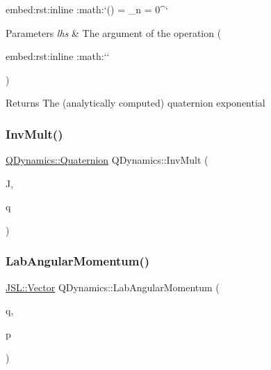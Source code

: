 \begin{DoxyVerb}embed:rst:inline :math:`\exp() = \sum_{n = 0}^\infty {}` \end{DoxyVerb}
 
\begin{DoxyParams}{Parameters}
{\em lhs} & The argument of the operation (\begin{DoxyVerb}embed:rst:inline :math:`` \end{DoxyVerb}
) \\
\hline
\end{DoxyParams}
\begin{DoxyReturn}{Returns}
The (analytically computed) quaternion exponential 
\end{DoxyReturn}
\mbox{\label{namespaceQDynamics_a78137919461ac257fe032f870771b0ed}} 
\subsubsection{\texorpdfstring{Inv\+Mult()}{InvMult()}}
{\footnotesize\ttfamily \hyperlink{classQDynamics_1_1Quaternion}{Q\+Dynamics\+::\+Quaternion} Q\+Dynamics\+::\+Inv\+Mult (\begin{DoxyParamCaption}\item[{const \hyperlink{classJSL_1_1Vector}{J\+S\+L\+::\+Vector} \&}]{J,  }\item[{const \hyperlink{classQDynamics_1_1Quaternion}{Q\+Dynamics\+::\+Quaternion} \&}]{q }\end{DoxyParamCaption})}

\mbox{\label{namespaceQDynamics_a4eabde69f542fcca92f97b1ef2e28b33}} 
\subsubsection{\texorpdfstring{Lab\+Angular\+Momentum()}{LabAngularMomentum()}}
{\footnotesize\ttfamily \hyperlink{classJSL_1_1Vector}{J\+S\+L\+::\+Vector} Q\+Dynamics\+::\+Lab\+Angular\+Momentum (\begin{DoxyParamCaption}\item[{const \hyperlink{classQDynamics_1_1Quaternion}{Q\+Dynamics\+::\+Quaternion} \&}]{q,  }\item[{const \hyperlink{classQDynamics_1_1Quaternion}{Q\+Dynamics\+::\+Quaternion} \&}]{p }\end{DoxyParamCaption})}

